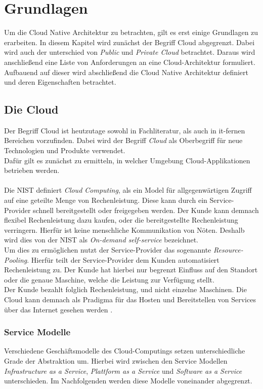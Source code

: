 \chapter{Grundlagen}
\label{ch:grundlagen}
Um die Cloud Native Architektur zu betrachten, gilt es erst einige Grundlagen zu erarbeiten. In diesem Kapitel wird zunächst der Begriff Cloud abgegrenzt. Dabei wird auch der unterschied von \textit{Public} und \textit{Private Cloud} betrachtet. Daraus wird anschließend eine Liste von Anforderungen an eine Cloud-Architektur formuliert. Aufbauend auf dieser wird abschließend die Cloud Native Architektur definiert und deren Eigenschaften betrachtet. 

\section{Die Cloud}
Der Begriff Cloud ist heutzutage sowohl in Fachliteratur, als auch in it-fernen Bereichen vorzufinden. Dabei wird der Begriff \textit{Cloud} als Oberbegriff für neue Technologien und Produkte verwendet.\\ 
Dafür gilt es zunächst zu ermitteln, in welcher Umgebung Cloud-Applikationen betrieben werden.\\\\
Die NIST definiert \textit{Cloud Computing}, als ein Model für allgegenwärtigen Zugriff auf eine geteilte Menge von Rechenleistung. Diese kann durch ein Service-Provider schnell bereitgestellt oder freigegeben werden. Der Kunde kann demnach flexibel Rechenleistung dazu kaufen, oder die bereitgestellte Rechenleistung verringern. Hierfür ist keine menschliche Kommunikation von Nöten. Deshalb wird dies von der NIST als \textit{On-demand self-service} bezeichnet.\\
Um dies zu ermöglichen nutzt der Service-Provider das sogenannte \textit{Resource-Pooling}. Hierfür teilt der Service-Provider dem Kunden automatisiert Rechenleistung zu. Der Kunde hat hierbei nur begrenzt Einfluss auf den Standort oder die genaue Maschine, welche die Leistung zur Verfügung stellt.\cite{mell_nist_2011}\\
Der Kunde bezahlt folglich Rechenleistung, und nicht einzelne Maschinen. Die Cloud kann demnach als Pradigma für das Hosten und Bereitstellen von Services über das Internet gesehen werden \cite{avram_advantages_2014}.

\subsection{Service Modelle}
Verschiedene Geschäftsmodelle des Cloud-Computings setzen unterschiedliche Grade der Abstraktion um. Hierbei wird zwischen den Service Modellen \textit{Infrastructure as a Service}, \textit{Plattform as a Service} und \textit{Software as a Service} unterschieden. Im Nachfolgenden werden diese Modelle voneinander abgegrenzt.

